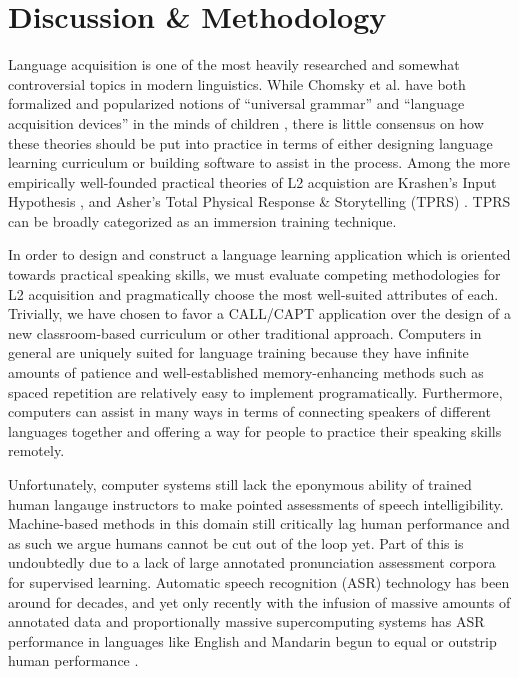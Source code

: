 \section{Discussion \& Methodology} 
Language acquisition is one of the most heavily researched and somewhat controversial topics in modern linguistics. While Chomsky et al. have both formalized and popularized notions of ``universal grammar'' and ``language acquisition devices'' in the minds of children \cite{chomsky1964aspects} \cite{chomsky1969acquisition} \cite{chomsky1972language}, there is little consensus on how these theories should be put into practice in terms of either designing language learning curriculum or building software to assist in the process. Among the more empirically well-founded practical theories of L2 acquistion are Krashen's Input Hypothesis \cite{krashen1985input} \cite{krashen1982principles}, and Asher's Total Physical Response \& Storytelling (TPRS) \cite{asher1977learning}. TPRS can be broadly categorized as an immersion training technique.

In order to design and construct a language learning application which is oriented towards practical speaking skills, we must evaluate competing methodologies for L2 acquisition and pragmatically choose the most well-suited attributes of each. Trivially, we have chosen to favor a CALL/CAPT application over the design of a new classroom-based curriculum or other traditional approach. Computers in general are uniquely suited for language training because they have infinite amounts of patience and well-established memory-enhancing methods such as spaced repetition \cite{glanzer1971repetition} \cite{wozniak2007supermemo} \cite{wozniak1990supermemo} \cite{cuddy1982forgetting} are relatively easy to implement programatically. Furthermore, computers can assist in many ways in terms of connecting speakers of different languages together and offering a way for people to practice their speaking skills remotely. 

Unfortunately, computer systems still lack the eponymous ability of trained human langauge instructors to make pointed assessments of speech intelligibility. Machine-based methods in this domain still critically lag human performance and as such we argue humans cannot be cut out of the loop yet. Part of this is undoubtedly due to a lack of large annotated pronunciation assessment corpora for supervised learning. Automatic speech recognition (ASR) technology has been around for decades, and yet only recently with the infusion of massive amounts of annotated data and proportionally massive supercomputing systems has ASR performance in languages like English and Mandarin begun to equal or outstrip human performance \cite{hannun2014deep} \cite{hinton2012deep} \cite{chan2016listen}. 

